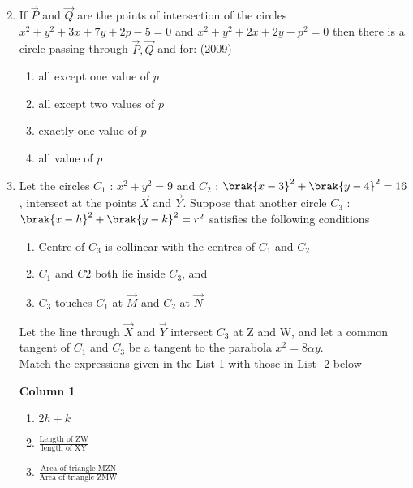 \begin{enumerate}
\begin{multicols}{2}
\begin{enumerate}
\end{enumerate}
\end{multicols}
\item If $\vec{P}$ and $\vec{Q}$ are the points of intersection of the circles $x^2+y^2+3x+7y+2p-5=0$ and $x^2+y^2+2x+2y-p^2=0$ then there is a circle passing through $\vec{P},  \vec{Q}$ and  for:
\hfill{(2009)}
\begin{multicols}{2}
\begin{enumerate}
\item all except one value of $p$
\item all except two values of $p$
\item exactly one value of $p$
\item all value of $p$
\end{enumerate}
\end{multicols}
    \item Let the circles $C_{1}$ : $x^2+y^2=9$ and $C_{2}$ : $\brak{x-3}^2+\brak{y-4}^2 = 16$,  intersect at the points $\vec{X}$ and $\vec{Y}$. Suppose that another circle $C_{3}$ : $\brak{x-h}^2+\brak{y-k}^2=r^2$ satisfies the following conditions
%
%
\begin{enumerate}[label=(\roman*)]
 \item Centre of $C_{3}$ is collinear with the centres of $C_{1}$ and $C_{2}$
 \item $C_{1}$ and $C{2}$ both lie inside $C_{3}$,  and
%
 \item $C_{3}$ touches $C_{1}$ at $\vec{M}$ and $C_{2}$ at  $\vec{N}$ 
\end{enumerate}
Let the line through $\vec{X}$ and $\vec{Y}$ intersect $C_{3}$ at Z and W,  and let a common tangent of $C_{1}$ and $C_{3}$ be a tangent to the parabola $x^2=8\alpha y.$\\ %
Match the expressions given in the List-1 with those in List -2 below
%
\begin{multicols}{2}
\textbf{Column 1}
\begin{multicols}{2}
\begin{enumerate}[label=(\Alph*)]           
\item $2h+k$                                  
\item $\frac{\text{Length of ZW}}{\text{length of XY}}$     
\item $\frac{\text{Area of triangle MZN}}{\text{Area of triangle ZMW}}$                     
\end{enumerate}

\end{multicols}
\end{multicols}
\end{enumerate}
